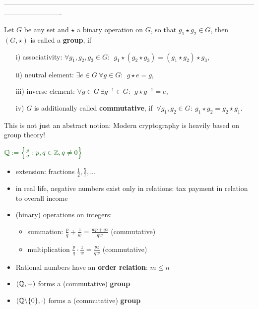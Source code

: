 {\begin{frame}
\vspace{1.5cm}
\small
-------------------------------------------------------------------------------------------------------------------------------------\\
\vspace{-0.3cm}
\begin{defi}[Group]\label{def:group} 
Let $G$ be any set and $\star$ a binary operation on $G$, so that $g_1 \star g_2 \in G$, then $(G, \star)$ is called a \textbf{group}, if
\begin{itemize}
	\item[i)] associativity: $\forall g_1, g_2, g_3 \in G:~~ g_1 \star (g_2 \star g_3) = (g_1 \star g_2) \star g_3$,
	\item[ii)] neutral element: $\exists e \in G ~\forall g\in G:~~ g \star e = g$,
	\item[iii)] inverse element: $\forall g\in G ~\exists g^{-1}\in G:~~ g \star g^{-1} = e$,
	\item[iv)] $G$ is additionally called \textbf{commutative}, if $~\forall g_1, g_2\in G:~g_1 \star g_2  = g_2 \star g_1  $.
\end{itemize}
\end{defi}
This is not just an abstract notion: Modern cryptography is heavily based on group theory!
\end{frame}
	
	\begin{frame}
	\vspace{0.5cm}
	$\color{defgruen}\Q:=\left\lbrace \frac{p}{q}: p,q\in\Z, q\neq 0\right\rbrace $
	\vspace{0.5cm}
	\begin{itemize}
		\item extension: fractions $\frac{1}{2},\frac{5}{7},... $
		\item in real life, negative numbers exist only in relations: tax payment in relation to overall income
		\item (binary) operations on integers:
		\begin{itemize} \normalsize
			\item summation: $\frac{p}{q} + \frac{z}{w} = \frac{wp + qz}{qw}$ (commutative)
			\item multiplication $\frac{p}{q} \cdot \frac{z}{w} = \frac{pz}{qw}$ (commutative)
		\end{itemize}
		\item Rational numbers have an \textbf{order relation}: $m\le n$
		\item $({\mathbb{Q}}, +)$ forms a (commutative) \textbf{group}
		\item $({\mathbb{Q}}\backslash \{0\}, \cdot)$ forms a (commutative) \textbf{group} 
		

\end{itemize}
\end{frame}}
